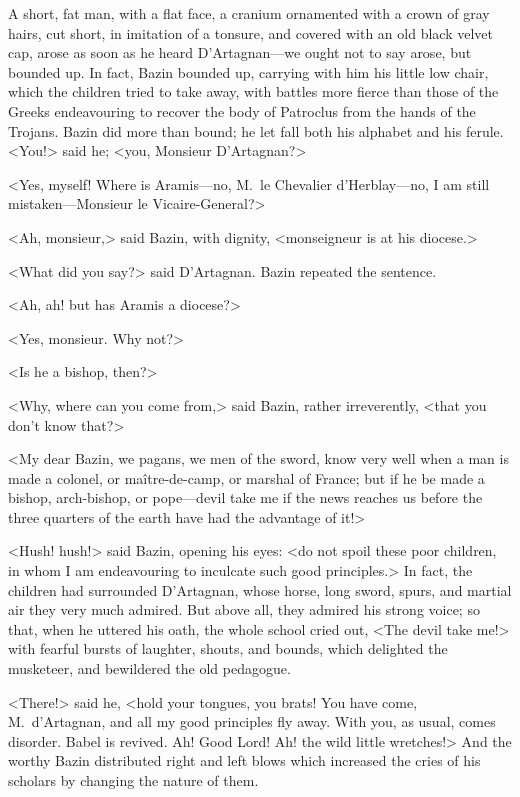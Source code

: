 A short, fat man, with a flat face, a cranium ornamented with a crown of gray hairs, cut short, in imitation of a tonsure, and covered with an old black velvet cap, arose as soon as he heard D'Artagnan—we ought not to say arose, but bounded up. In fact, Bazin bounded up, carrying with him his little low chair, which the children tried to take away, with battles more fierce than those of the Greeks endeavouring to recover the body of Patroclus from the hands of the Trojans. Bazin did more than bound; he let fall both his alphabet and his ferule. <You!> said he; <you, Monsieur D'Artagnan?>

<Yes, myself! Where is Aramis—no, M.~le Chevalier d'Herblay—no, I am still mistaken—Monsieur le Vicaire-General?>

<Ah, monsieur,> said Bazin, with dignity, <monseigneur is at his diocese.>

<What did you say?> said D'Artagnan. Bazin repeated the sentence.

<Ah, ah! but has Aramis a diocese?>

<Yes, monsieur. Why not?>

<Is he a bishop, then?>

<Why, where can you come from,> said Bazin, rather irreverently, <that you don't know that?>

<My dear Bazin, we pagans, we men of the sword, know very well when a man is made a colonel, or maître-de-camp, or marshal of France; but if he be made a bishop, arch-bishop, or pope—devil take me if the news reaches us before the three quarters of the earth have had the advantage of it!>

<Hush! hush!> said Bazin, opening his eyes: <do not spoil these poor children, in whom I am endeavouring to inculcate such good principles.> In fact, the children had surrounded D'Artagnan, whose horse, long sword, spurs, and martial air they very much admired. But above all, they admired his strong voice; so that, when he uttered his oath, the whole school cried out, <The devil take me!> with fearful bursts of laughter, shouts, and bounds, which delighted the musketeer, and bewildered the old pedagogue.

<There!> said he, <hold your tongues, you brats! You have come, M.~d'Artagnan, and all my good principles fly away. With you, as usual, comes disorder. Babel is revived. Ah! Good Lord! Ah! the wild little wretches!> And the worthy Bazin distributed right and left blows which increased the cries of his scholars by changing the nature of them.

